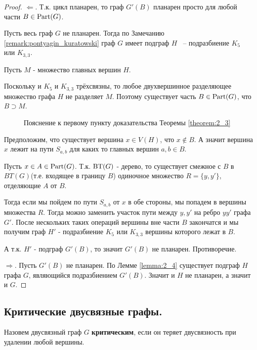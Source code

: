 \begin{proof}
	$\Longleftarrow$. Т.к. цикл планарен, то граф $G'(B)$ планарен просто для любой части  $B \in \operatorname{Part}(G)$.

	Пусть весь граф $G$ не планарен. Тогда по Замечанию \ref{remark:pontyagin_kuratowski} граф  $G$ имеет подграф  $H$ ~-- подразбиение  $K_5$ или  $K_{3,3}$.

	Пусть $M$ - множество главных вершин  $H$.

	Поскольку и $K_5$ и  $K_{3,3}$ трёхсвязны, то любое двухвершинное разделяющее множество графа  $H$ не разделяет $M$.
	Поэтому существует часть  $B \in \operatorname{Part}(G)$, что  $B \supset M$.

\begin{figure}[ht]
    \centering
	\caption{Пояснение к первому пункту доказательства Теоремы \ref{theorem:2_3}}
    \label{fig:theorem_2_3}
\end{figure}

	Предположим, что существует вершина $x \in V(H)$, что  $x \not \in B$.
	А значит вершина $x$ лежит на пути  $S_{a, b}$ для каких то главных вершин $a, b \in B$.

	Пусть $x \in A \in \operatorname{Part}(G)$.
	Т.к. $\operatorname{BT}(G)$ - дерево, то существует смежное с  $B$ в  $BT(G)$(т.е. входящее в границу $B$) одиночное множество $R = \{y, y'\}$, отделяющие $A$ от  $B$.

	Тогда если мы пойдем по пути  $S_{a, b}$ от  $x$ в обе стороны, мы попадем в вершины множества  $R$.
	Тогда можно заменить участок пути между  $y, y'$ на ребро $yy'$ графа  $G'$.
	После нескольких таких операций вершины вне части  $B$ закончатся и мы получим граф  $H'$ - подразбиение  $K_5$ или  $K_{3,3}$ вершины которого лежат в  $B$.

	А т.к.  $H'$ - подграф  $G'(B)$, то значит  $G'(B)$ не планарен. Противоречие.

	 $\Longrightarrow$. Пусть  $G'(B)$ не планарен.
	 По Лемме \ref{lemma:2_4} существует подграф  $H$ графа  $G$, являющийся подразбиением  $G'(B)$.
	 Значит и  $H$ не планарен, а значит и  $G$.

\end{proof}

\subsection{Критические двусвязные графы.}

\begin{df*}
	Назовем двусвязный граф  $G$ \textbf{критическим}, если он  теряет двусвязность при удалении любой вершины.
\end{df*}

